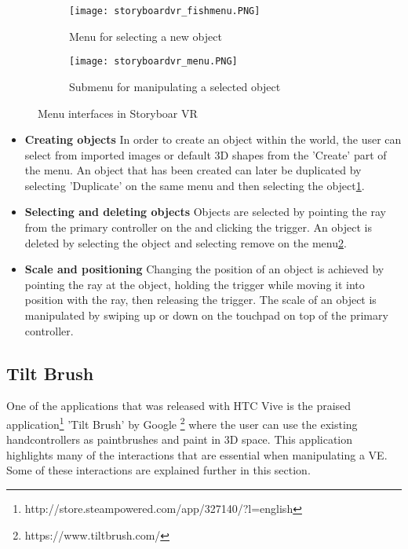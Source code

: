 \begin{figure}
\begin{subfigure}{.5\textwidth}
  \centering
  \texttt{[image: storyboardvr\_fishmenu.PNG]}
  \caption{Menu for selecting a new object}
  \label{fig:storyboard:fishmenu}
\end{subfigure}%
\begin{subfigure}{.5\textwidth}
  \centering
  \texttt{[image: storyboardvr\_menu.PNG]}
  \caption{Submenu for manipulating a selected object}
  \label{fig:storyboard:menu}
\end{subfigure}
\caption{Menu interfaces in Storyboar VR}
\label{fig:storyboard}
\end{figure}
\begin{itemize}


\item \textbf{Creating objects}
In order to create an object within the world, the user can select from imported images or default 3D shapes from the 'Create' part of the menu. An object that has been created can later be duplicated by selecting 'Duplicate' on the same menu and then selecting the object\ref{fig:storyboard:fishmenu}.
\item \textbf{Selecting and deleting objects}
Objects are selected by pointing the ray from the primary controller on the and clicking the trigger. An object is deleted by selecting the object and selecting remove on the menu\ref{fig:storyboard:menu}.
\item \textbf{Scale and positioning}
Changing the position of an object is achieved by pointing the ray at the object, holding the trigger while moving it into position with the ray, then releasing the trigger. The scale of an object is manipulated by  swiping up or down on the touchpad on top of the primary controller.
\end{itemize}
\subsection{Tilt Brush}
\label{relatedwork:tiltbrush}
 One of the applications that was released with HTC Vive is the praised application\footnote{http://store.steampowered.com/app/327140/?l=english} 'Tilt Brush' by Google \footnote{https://www.tiltbrush.com/} where the user can use the existing handcontrollers as paintbrushes and paint in 3D space. This application highlights many of the interactions that are essential when manipulating a VE. Some of these interactions are explained further in this section.


